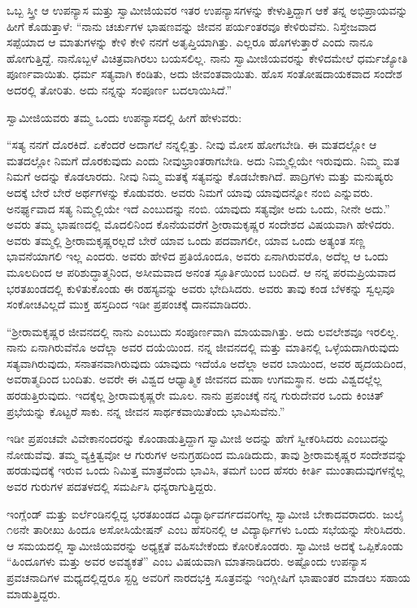  ಒಬ್ಬ ಸ್ತ್ರೀ ಆ ಉಪನ್ಯಾಸ ಮತ್ತು ಸ್ವಾಮೀಜಿಯವರ ಇತರ ಉಪನ್ಯಾಸಗಳನ್ನು ಕೇಳುತ್ತಿದ್ದಾಗ ಆಕೆ ತನ್ನ ಅಭಿಪ್ರಾಯವನ್ನು ಹೀಗೆ ಕೊಡುತ್ತಾಳೆ: “ನಾನು ಚರ್ಚುಗಳ ಭಾಷಣವನ್ನು ಜೀವನ ಪರ್ಯಂತರವೂ ಕೇಳಿರುವೆನು. ನಿಸ್ತೇಜವಾದ ಸಪ್ಪೆಯಾದ ಆ ಮಾತುಗಳನ್ನು ಕೇಳಿ ಕೇಳಿ ನನಗೆ ಅತೃಪ್ತಿಯಾಗಿತ್ತು. ಎಲ್ಲರೂ ಹೊಗಳುತ್ತಾರೆ ಎಂದು ನಾನೂ ಹೋಗುತ್ತಿದ್ದೆ. ನಾನೊಬ್ಬಳೆ ವಿಚಿತ್ರವಾಗಿರಲು ಬಯಸಲಿಲ್ಲ. ನಾನು ಸ್ವಾಮೀಜಿಯವರನ್ನು ಕೇಳಿದಮೇಲೆ ಧರ್ಮಜ್ಯೋತಿ ಪೂರ್ಣವಾಯಿತು. ಧರ್ಮ ಸತ್ಯವಾಗಿ ಕಂಡಿತು, ಅದು ಜೀವಂತವಾಯಿತು. ಹೊಸ ಸಂತೋಷದಾಯಕವಾದ ಸಂದೇಶ ಅದರಲ್ಲಿ ತೋರಿತು. ಅದು ನನ್ನನ್ನು ಸಂಪೂರ್ಣ ಬದಲಾಯಿಸಿದೆ.” 

 ಸ್ವಾಮೀಜಿಯವರು ತಮ್ಮ ಒಂದು ಉಪನ್ಯಾಸದಲ್ಲಿ ಹೀಗೆ ಹೇಳುವರು: 

 “ಸತ್ಯ ನನಗೆ ದೊರಕಿದೆ. ಏಕೆಂದರೆ ಅದಾಗಲೆ ನನ್ನಲ್ಲಿತ್ತು. ನೀವು ಮೋಸ ಹೋಗಬೇಡಿ. ಈ ಮತದಲ್ಲೋ ಆ ಮತದಲ್ಲೋ ನಿಮಗೆ ದೊರಕುವುದು ಎಂದು ನೀವು\break ಭ್ರಾಂತರಾಗಬೇಡಿ. ಅದು ನಿಮ್ಮಲ್ಲಿಯೇ ಇರುವುದು. ನಿಮ್ಮ ಮತ ನಿಮಗೆ ಅದನ್ನು ಕೊಡಲಾರದು. ನೀವು ನಿಮ್ಮ ಮತಕ್ಕೆ ಸತ್ಯವನ್ನು ಕೊಡಬೇಕಾಗಿದೆ. ಪಾದ್ರಿಗಳು ಮತ್ತು ಮನುಷ್ಯರು ಅದಕ್ಕೆ ಬೇರೆ ಬೇರೆ ಅರ್ಥಗಳನ್ನು ಕೊಡುವರು. ಅವರು ನಿಮಗೆ ಯಾವು ಯಾವುದನ್ನೋ ನಂಬಿ ಎನ್ನುವರು. ಅನರ್ಘ್ಯವಾದ ಸತ್ಯ ನಿಮ್ಮಲ್ಲಿಯೇ ಇದೆ ಎಂಬುದನ್ನು ನಂಬಿ. ಯಾವುದು ಸತ್ಯವೋ ಅದು ಒಂದು, ನೀನೇ ಅದು.” ಅವರು ತಮ್ಮ ಭಾಷಣದಲ್ಲಿ ಮೊದಲಿನಿಂದ ಕೊನೆಯವರೆಗೆ ಶ‍್ರೀರಾಮಕೃಷ್ಣರ ಸಂದೇಶದ ವಿಷಯವಾಗಿ ಹೇಳಿದರು. ಅವರು ತಮ್ಮಲ್ಲಿ ಶ‍್ರೀರಾಮಕೃಷ್ಣರಲ್ಲದೆ ಬೇರೆ ಯಾವ ಒಂದು ಪದವಾಗಲೀ, ಯಾವ ಒಂದು ಅತ್ಯಂತ ಸಣ್ಣ ಭಾವನೆಯಾಗಲಿ ಇಲ್ಲ ಎಂದರು. ಅವರು ಹೇಳಿದ ಪ್ರತಿಯೊಂದೂ, ಅವರು ಏನಾಗಿರುವರೊ, ಅದೆಲ್ಲ ಆ ಒಂದು ಮೂಲದಿಂದ ಆ ಪರಿಶುದ್ಧಾತ್ಮನಿಂದ, ಅಸೀಮವಾದ ಅನಂತ ಸ್ಫೂರ್ತಿಯಿಂದ ಬಂದಿದೆ. ಆ ನನ್ನ ಪರಮಪ್ರಿಯವಾದ ಭರತಖಂಡದಲ್ಲಿ ಕುಳಿತುಕೊಂಡು ಈ ರಹಸ್ಯವನ್ನು ಅವರು ಭೇದಿಸಿದರು. ಅವರು ತಾವು ಕಂಡ ಬೆಳಕನ್ನು ಸ್ವಲ್ಪವೂ ಸಂಕೋಚವಿಲ್ಲದೆ ಮುಕ್ತ ಹಸ್ತದಿಂದ ಇಡೀ ಪ್ರಪಂಚಕ್ಕೆ ದಾನ\break ಮಾಡಿದರು. 

\vskip 3pt

 “ಶ‍್ರೀರಾಮಕೃಷ್ಣರ ಜೀವನದಲ್ಲಿ ನಾನು ಎಂಬುದು ಸಂಪೂರ್ಣವಾಗಿ ಮಾಯವಾಗಿತ್ತು. ಅದು ಲವಲೇಶವೂ ಇರಲಿಲ್ಲ. ನಾನು ಏನಾಗಿರುವೆನೊ ಅದೆಲ್ಲಾ ಅವರ ದಯೆಯಿಂದ. ನನ್ನ ಜೀವನದಲ್ಲಿ ಮತ್ತು ಮಾತಿನಲ್ಲಿ ಒಳ್ಳೆಯದಾಗಿರುವುದು ಸತ್ಯವಾಗಿರುವುದು, ಸನಾತನವಾಗಿರುವುದು ಯಾವುದು ಇದೆಯೊ ಅದೆಲ್ಲಾ ಅವರ ಬಾಯಿಂದ, ಅವರ ಹೃದಯದಿಂದ, ಅವರಾತ್ಮದಿಂದ ಬಂದಿತು. ಅವರೇ ಈ ವಿಶ್ವದ ಆಧ್ಯಾತ್ಮಿಕ ಜೀವನದ ಮಹಾ ಉಗಮಸ್ಥಾನ. ಅದು ವಿಶ್ವದಲ್ಲೆಲ್ಲ ಹರಡುತ್ತಿರುವುದು. ಇದಕ್ಕೆಲ್ಲ ಶ‍್ರೀರಾಮಕೃಷ್ಣರೇ ಮೂಲ. ನಾನು ಪ್ರಪಂಚಕ್ಕೆ ನನ್ನ ಗುರುದೇವರ ಒಂದು ಕಿಂಚಿತ್ ಪ್ರಭೆಯನ್ನು ಕೊಟ್ಟರೆ ಸಾಕು. ನನ್ನ ಜೀವನ ಸಾರ್ಥಕವಾಯಿತೆಂದು ಭಾವಿಸುವೆನು.” 

\vskip 3pt

 ಇಡೀ ಪ್ರಪಂಚವೇ ವಿವೇಕಾನಂದರನ್ನು ಕೊಂಡಾಡುತ್ತಿದ್ದಾಗ ಸ್ವಾಮೀಜಿ ಅದನ್ನು ಹೇಗೆ ಸ್ವೀಕರಿಸಿದರು ಎಂಬುದನ್ನು ನೋಡುವೆವು. ತಮ್ಮ ವ್ಯಕ್ತಿತ್ವವೋ ಆ ಗುರುಗಳ ಅನುಗ್ರಹದಿಂದ ಮೂಡಿದುದು, ತಾವು ಶ‍್ರೀರಾಮಕೃಷ್ಣರ ಸಂದೇಶವನ್ನು ಹರಡುವುದಕ್ಕೆ ಇರುವ ಒಂದು ನಿಮಿತ್ತ ಮಾತ್ರವೆಂದು ಭಾವಿಸಿ, ತಮಗೆ ಬಂದ ಹೆಸರು ಕೀರ್ತಿ ಮುಂತಾದುವುಗಳನ್ನೆಲ್ಲ ಅವರ ಗುರುಗಳ ಪದತಳದಲ್ಲಿ ಸಮರ್ಪಿಸಿ ಧನ್ಯರಾಗುತ್ತಿದ್ದರು. 

\vskip 3pt

 ಇಂಗ್ಲೆಂಡ್ ಮತ್ತು ಐರ್ಲೆಂಡಿನಲ್ಲಿದ್ದ ಭರತಖಂಡದ ವಿದ್ಯಾರ್ಥಿವರ್ಗದವರಿಗೆಲ್ಲ ಸ್ವಾಮೀಜಿ ಬೇಕಾದವರಾದರು. ಜುಲೈ ೧೮ನೇ ತಾರೀಖು ಹಿಂದೂ ಅಸೋಸಿಯೇಷನ್ ಎಂಬ ಹೆಸರಿನಲ್ಲಿ ಆ ವಿದ್ಯಾರ್ಥಿಗಳು ಒಂದು ಸಭೆಯನ್ನು ಸೇರಿಸಿದರು. ಆ ಸಮಯದಲ್ಲಿ ಸ್ವಾಮೀಜಿಯವರನ್ನು ಅಧ್ಯಕ್ಷತೆ ವಹಿಸಬೇಕೆಂದು ಕೋರಿಕೊಂಡರು. ಸ್ವಾಮೀಜಿ ಅದಕ್ಕೆ ಒಪ್ಪಿಕೊಂಡು “ಹಿಂದೂಗಳು ಮತ್ತು ಅವರ ಅವಶ್ಯಕತೆ” ಎಂಬ ವಿಷಯವಾಗಿ ಮಾತನಾಡಿದರು. ಅಷ್ಟೊಂದು ಉಪನ್ಯಾಸ ಪ್ರವಚನಾದಿಗಳ ಮಧ್ಯದಲ್ಲಿದ್ದರೂ ಸ್ಟರ‍್ಡಿ ಅವರಿಗೆ ನಾರದಭಕ್ತಿ ಸೂತ್ರವನ್ನು ಇಂಗ್ಲೀಷಿಗೆ ಭಾಷಾಂತರ ಮಾಡಲು ಸಹಾಯ ಮಾಡುತ್ತಿದ್ದರು. 

